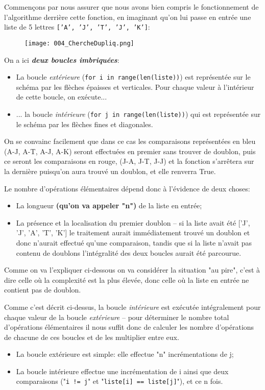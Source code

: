 \documentclass[12pt]{article}
\begin{document}
	\begin{MaReponse}
		\begin{alphenum}
			\item Commençons par nous assurer que nous avons bien compris le fonctionnement de l'algorithme derrière cette fonction, en imaginant qu'on lui passe en entrée une liste de 5 lettres \texttt{['A', 'J', 'T', 'J', 'K']}:
			\begin{figure}[H]
				\centering
				\texttt{[image: 004\_ChercheDupliq.png]}
			\end{figure}
			On a ici \textbf{\textit{deux boucles imbriquées}}:
			\begin{itemize}
				\item La boucle \textit{extérieure} (\texttt{for i in range(len(liste))}) est représentée sur le schéma par les flèches épaisses et verticales. Pour chaque valeur à l'intérieur de cette boucle, on exécute...
				\item ... la boucle \textit{intérieure} (\texttt{for j in range(len(liste))}) qui est représentée sur le schéma par les flèches fines et diagonales.
			\end{itemize}
			On se convainc facilement que dans ce cas les comparaisons représentées en bleu (A-J, A-T, A-J, A-K) seront effectuées en premier sans trouver de doublon, puis ce seront les comparaisons en rouge, (J-A, J-T, J-J) et la fonction s'arrêtera sur la dernière puisqu'on aura trouvé un doublon, et elle renverra True.
			
			Le nombre d'opérations élémentaires dépend donc à l'évidence de deux choses:
			\begin{itemize}
				\item La longueur \textbf{(qu'on va appeler "n")} de la liste en entrée;
				\item La présence et la localisation du premier doublon -- si la liste avait été ['J', 'J', 'A', 'T', 'K'] le traitement aurait immédiatement trouvé un doublon et donc n'aurait effectué qu'une comparaison, tandis que si la liste n'avait pas contenu de doublons l'intégralité des deux boucles aurait été parcourue.
			\end{itemize}
			Comme on va l'expliquer ci-dessous on va considérer la situation "au pire", c'est à dire celle où la complexité est la plus élevée, donc celle où la liste en entrée ne contient pas de doublon.
			
			Comme c'est décrit ci-dessus, la boucle \textit{intérieure} est exécutée intégralement pour chaque valeur de la boucle \textit{extérieure} -- pour déterminer le nombre total d'opérations élémentaires il nous suffit donc de calculer les nombre d'opérations de chacune de ces boucles et de les multiplier entre eux.
			\begin{itemize}
				\item La boucle extérieure est simple: elle effectue "n" incrémentations de j;
				\item La boucle intérieure effectue une incrémentation de i ainsi que deux comparaisons ("\texttt{i != j}" et "\texttt{liste[i] == liste[j]}"), et ce n fois.
			\end{itemize}
			

\end{alphenum}
\end{MaReponse}
\end{document}
